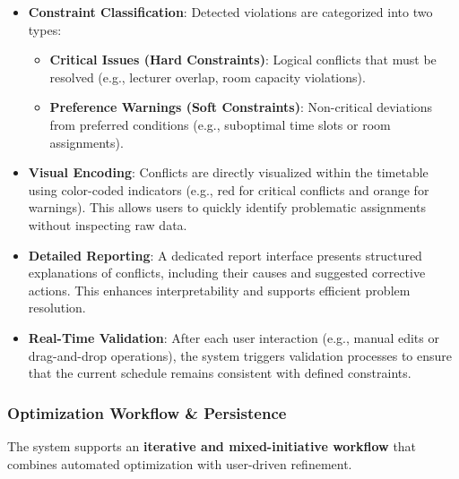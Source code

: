 \documentclass[11pt,a4paper]{article}
\begin{document}
\begin{itemize}
    \item \textbf{Constraint Classification}: Detected violations are categorized into two types:
        \begin{itemize}
            \item \textbf{Critical Issues (Hard Constraints)}: Logical conflicts that must be resolved (e.g., lecturer overlap, room capacity violations).
            \item \textbf{Preference Warnings (Soft Constraints)}: Non-critical deviations from preferred conditions (e.g., suboptimal time slots or room assignments).
        \end{itemize}
    
    \item \textbf{Visual Encoding}: Conflicts are directly visualized within the timetable using color-coded indicators (e.g., red for critical conflicts and orange for warnings). This allows users to quickly identify problematic assignments without inspecting raw data.
    
    \item \textbf{Detailed Reporting}: A dedicated report interface presents structured explanations of conflicts, including their causes and suggested corrective actions. This enhances interpretability and supports efficient problem resolution.
    
    \item \textbf{Real-Time Validation}: After each user interaction (e.g., manual edits or drag-and-drop operations), the system triggers validation processes to ensure that the current schedule remains consistent with defined constraints.
\end{itemize}


\subsubsection{Optimization Workflow \& Persistence}

The system supports an \textbf{iterative and mixed-initiative workflow} that combines automated optimization with user-driven refinement.
\end{document}
